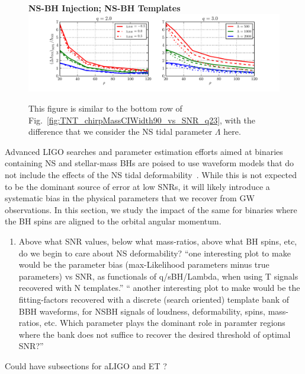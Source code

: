 \documentclass[aps,prd,amsmath,floats,floatfix, twocolumn,
superscriptaddress,nofootinbib,showpacs]{revtex4-1}
\begin{document}
% 
\begin{figure}
\centering
\textbf{NS-BH Injection; NS-BH Templates}
\includegraphics[width=1.7\columnwidth]{plots/TT_NSLambdaCIWidth90_vs_SNR_q23.pdf}
\caption{This figure is similar to the bottom row of
Fig.~\ref{fig:TNT_chirpMassCIWidth90_vs_SNR_q23}, with the difference that  
we consider the NS tidal parameter $\Lambda$ here.}
\label{fig:TT_NSLambdaCIWidth90_vs_SNR_q23}
\end{figure}
% 
% 
Advanced LIGO searches and parameter estimation efforts aimed at binaries 
containing NS and stellar-mass BHs are poised to use waveform models that do not
include the effects of the NS tidal deformability~\cite{Canton:2014ena}.
While this is not expected to
be the dominant source of error at low SNRs, it will likely introduce a
systematic bias in the physical parameters that we recover from GW observations.
In this section, we study the impact of the same for binaries where the BH spins
are aligned to the orbital angular momentum.

\begin{enumerate}
\item Above what SNR values, below what mass-ratios, above what BH spins, etc, 
do we begin to care about NS deformability?\newline
``one interesting plot to make would be the parameter bias (max-Likelihood
parameters minus true parameters) vs SNR, as functionals of q/sBH/Lambda, when
using T signals recovered with N templates.''\newline
`` another interesting plot to make would be the fitting-factors recovered with
a discrete (search oriented) template bank of BBH waveforms, for NSBH signals of
loudness, deformability, spins, mass-ratios, etc. Which parameter plays the 
dominant role in paramter regions where the bank does not suffice to recover
the desired threshold of optimal SNR?''
\end{enumerate}


Could have subsections for aLIGO and ET ?

\end{document}
